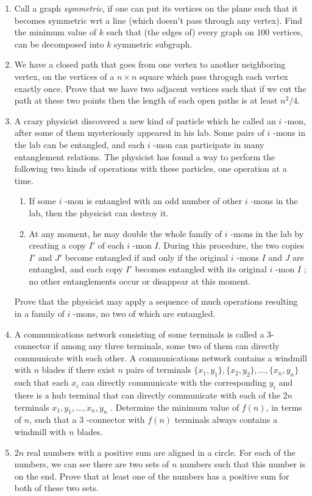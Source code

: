 \begin{enumerate}
	\item Call a graph \textit{symmetric}, if one can put its vertices on the plane such that it becomes symmetric wrt a line (which doesn't pass through any vertex). Find the minimum value of $ k $ such that (the edges of) every graph on $ 100 $ vertices, can be decomposed into $ k $ symmetric subgraph.
	
	\item We have a closed path that goes from one vertex to another neighboring vertex, on the vertices of a $ n\times n$ square which pass throgugh each vertex exactly once. Prove that we have two adjacent vertices such that if we cut the path at these two points then the length of each open paths is at least $ n^2/4 $.
	
	\item A crazy physicist discovered a new kind of particle which he called an $ i $ -mon, after some of them mysteriously appeared in his lab. Some pairs of $ i $ -mons in the lab can be entangled, and each $ i $ -mon can participate in many entanglement relations. The physicist has found a way to perform the following two kinds of operations with these particles, one operation at a time.
	
	\begin{enumerate}
		
		\item If some $ i $ -mon is entangled with an odd number of other $ i $ -mons in the lab, then the physicist can destroy it.
		
		\item At any moment, he may double the whole family of $ i $ -mons in the lab by creating a copy $ I' $ of each $ i $ -mon $ I $. During this procedure, the two copies $ I' $ and $ J' $ become entangled if and only if the original $ i $ -mons $ I $ and $ J $ are entangled, and each copy $ I' $ becomes entangled with its original $ i $ -mon $ I $ ; no other entanglements occur or disappear at this moment.
	\end{enumerate}

	Prove that the physicist may apply a sequence of much operations resulting in a family of $ i $ -mons, no two of which are entangled.

	\item A communications network consisting of some terminals is called a $3$-connector if among any three terminals, some two of them can directly communicate with each other. A communications network contains a windmill with $n$ blades if there exist $n$ pairs of terminals $\{x_{1},y_{1}\},\{x_{2},y_{2}\},\ldots,\{x_{n},y_{n}\}$ such that each $x_{i}$ can directly communicate with the corresponding $y_{i}$ and there is a hub terminal that can directly communicate with each of the $2n$ terminals $x_{1}, y_{1},\ldots,x_{n}, y_{n}$ . Determine the minimum value of $f (n)$, in terms of $n$, such that a $3$ -connector with $f (n)$ terminals always contains a windmill with $n$ blades.

	\item $ 2n $ real numbers with a positive sum are aligned in a circle. For each of the numbers, we can see there are two sets of $ n $ numbers such that this number is on the end. Prove that at least one of the numbers has a positive sum for both of these two sets.
\end{enumerate}